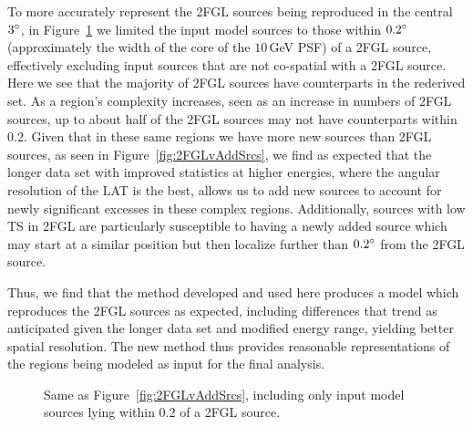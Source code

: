 To more accurately represent the 2FGL sources being reproduced in the central $3\mbox{$^\circ$}$, in Figure~\ref{fig:2FGLvAddSrcsAssoc} we limited the input model sources to those within $0.2\mbox{$^\circ$}$ (approximately the width of the core of the $10$\,GeV PSF) of a 2FGL source, effectively excluding input sources that are not co-spatial with a 2FGL source. Here we see that the majority of 2FGL sources have counterparts in the rederived set. As a region's complexity increases, seen as an increase in numbers of 2FGL sources, up to about half of the 2FGL sources may not have counterparts within $0.2$\degr. Given that in these same regions we have more new sources than 2FGL sources, as seen in Figure~\ref{fig:2FGLvAddSrcs}, we find as expected that the longer data set with improved statistics at higher energies, where the angular resolution of the LAT is the best, allows us to add new sources to account for newly significant excesses in these complex regions. Additionally, sources with low TS in 2FGL are particularly susceptible to having a newly added source which may start at a similar position but then localize further than $0.2\mbox{$^\circ$}$ from the 2FGL source. 

Thus, we find that the method developed and used here produces a model which reproduces the 2FGL sources as expected, including differences that trend as anticipated given the longer data set and modified energy range, yielding better spatial resolution. The new method thus provides reasonable representations of the regions being modeled as input for the final analysis.

\begin{figure}[h!]
	\centering
	\caption[Same as Figure~\ref{fig:2FGLvAddSrcs}, including only input model sources lying within $0.2$\degr{} of a 2FGL source.]{Same as Figure~\ref{fig:2FGLvAddSrcs}, including only input model sources lying within $0.2$\degr{} of a 2FGL source.}
	\label{fig:2FGLvAddSrcsAssoc} 
\end{figure}

